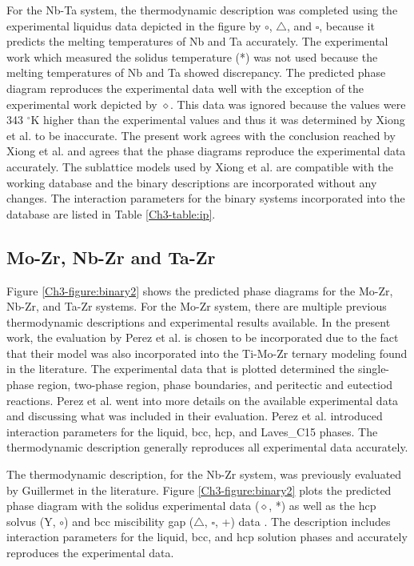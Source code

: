 For the Nb-Ta system, the thermodynamic description was completed using the experimental liquidus data \cite{Xiong2004} depicted in the figure by $\circ$, $\bigtriangleup$, and $\square$, because it predicts the melting temperatures of Nb and Ta accurately. The experimental work which measured the solidus temperature (*) was not used because the melting temperatures of Nb and Ta showed discrepancy. The predicted phase diagram reproduces the experimental data well with the exception of the experimental work depicted by $\diamond$. This data was ignored because the values were 343 $^{\circ}$K higher than the experimental values and thus it was determined by Xiong et al. \cite{Xiong2004} to be inaccurate. The present work agrees with the conclusion reached by Xiong et al. \cite{Xiong2004} and agrees that the phase diagrams reproduce the experimental data accurately. The sublattice models used by Xiong et al. \cite{Xiong2004} are compatible with the working database and the binary descriptions are incorporated without any changes. The interaction parameters for the binary systems incorporated into the database are listed in Table \ref{Ch3-table:ip}. 

\subsection{Mo-Zr, Nb-Zr and Ta-Zr}

Figure \ref{Ch3-figure:binary2} shows the predicted phase diagrams for the Mo-Zr, Nb-Zr, and Ta-Zr systems. For the Mo-Zr system, there are multiple previous thermodynamic descriptions and experimental results available. In the present work, the evaluation by Perez et al. \cite{Perez2003} is chosen to be incorporated due to the fact that their model was also incorporated into the Ti-Mo-Zr ternary modeling found in the literature. The experimental data that is plotted determined the single-phase region, two-phase region, phase boundaries, and peritectic and eutectiod reactions. Perez et al. \cite{Perez2003} went into more details on the available experimental data and discussing what was included in their evaluation. Perez et al. \cite{Perez2003} introduced interaction parameters for the liquid, bcc, hcp, and Laves\_C15 phases. The thermodynamic description generally reproduces all experimental data accurately. 

The thermodynamic description, for the Nb-Zr system, was previously evaluated by Guillermet \cite{Guillermet1991} in the literature. Figure \ref{Ch3-figure:binary2} plots the predicted phase diagram with the solidus experimental data ($\diamond$, *) as well as the hcp solvus (Y, $\circ$) and bcc miscibility gap ($\bigtriangleup$, $\square$, +) data \cite{Guillermet1991,Kumar1994a,Abriata1982}. The description includes interaction parameters for the liquid, bcc, and hcp solution phases and accurately reproduces the experimental data. 

